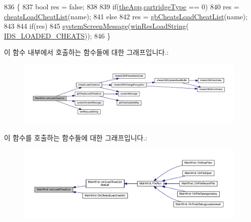 \begin{DoxyCode}
836 \{
837   \textcolor{keywordtype}{bool} res = \textcolor{keyword}{false};
838 
839   \textcolor{keywordflow}{if}(\mbox{\hyperlink{_v_b_a_8cpp_a8095a9d06b37a7efe3723f3218ad8fb3}{theApp}}.\mbox{\hyperlink{class_v_b_a_af300759fcbc7eeb00ce73f956fc5ddb7}{cartridgeType}} == 0)
840     res = \mbox{\hyperlink{_cheats_8cpp_adb19e11317546121ea38ac7f33a2af6f}{cheatsLoadCheatList}}(name);
841   \textcolor{keywordflow}{else}
842     res = \mbox{\hyperlink{gb_cheats_8cpp_aa08d2a2e0e2149ffa048dd38c317da3f}{gbCheatsLoadCheatList}}(name);
843 
844   \textcolor{keywordflow}{if}(res)
845     \mbox{\hyperlink{system_8cpp_a0412545bfaba2004bf7a42d779ea5659}{systemScreenMessage}}(\mbox{\hyperlink{_win_res_util_8cpp_a416e85e80ab9b01376e87251c83d1a5a}{winResLoadString}}(
      \mbox{\hyperlink{resource_8h_a0418b3299144ee7af0bd22ad78823016}{IDS\_LOADED\_CHEATS}}));
846 \}
\end{DoxyCode}
이 함수 내부에서 호출하는 함수들에 대한 그래프입니다.\+:
\nopagebreak
\begin{figure}[H]
\begin{center}
\leavevmode
\includegraphics[width=350pt]{class_main_wnd_adfe445d042cd87dfa30b07fdcfa7eeff_cgraph}
\end{center}
\end{figure}
이 함수를 호출하는 함수들에 대한 그래프입니다.\+:
\nopagebreak
\begin{figure}[H]
\begin{center}
\leavevmode
\includegraphics[width=350pt]{class_main_wnd_adfe445d042cd87dfa30b07fdcfa7eeff_icgraph}
\end{center}
\end{figure}
\mbox{\label{class_main_wnd_a9d0fc611b92ef43d6a56c9f785051bee}} 
